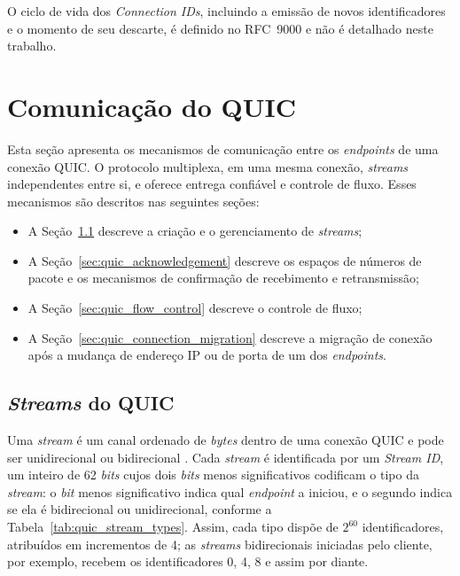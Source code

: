 O ciclo de vida dos \textit{Connection IDs}, incluindo a emissão de novos identificadores e o momento de seu descarte, é definido no RFC~9000 \citep{rfc9000} e não é detalhado neste trabalho.

\section{Comunicação do QUIC}

Esta seção apresenta os mecanismos de comunicação entre os \textit{endpoints} de uma conexão QUIC. O protocolo multiplexa, em uma mesma conexão, \textit{streams} independentes entre si, e oferece entrega confiável e controle de fluxo. Esses mecanismos são descritos nas seguintes seções:

\begin{itemize}
    \item A Seção~\ref{sec:quic_streams} descreve a criação e o gerenciamento de \textit{streams};
    \item A Seção~\ref{sec:quic_acknowledgement} descreve os espaços de números de pacote e os mecanismos de confirmação de recebimento e retransmissão;
    \item A Seção~\ref{sec:quic_flow_control} descreve o controle de fluxo;
    \item A Seção~\ref{sec:quic_connection_migration} descreve a migração de conexão após a mudança de endereço IP ou de porta de um dos \textit{endpoints}.
\end{itemize}

\subsection{\textit{Streams} do QUIC}
\label{sec:quic_streams}

Uma \textit{stream} é um canal ordenado de \textit{bytes} dentro de uma conexão QUIC e pode ser unidirecional ou bidirecional \citep{rfc9000}. Cada \textit{stream} é identificada por um \textit{Stream ID}, um inteiro de 62 \textit{bits} cujos dois \textit{bits} menos significativos codificam o tipo da \textit{stream}: o \textit{bit} menos significativo indica qual \textit{endpoint} a iniciou, e o segundo indica se ela é bidirecional ou unidirecional, conforme a Tabela~\ref{tab:quic_stream_types}. Assim, cada tipo dispõe de $2^{60}$ identificadores, atribuídos em incrementos de 4; as \textit{streams} bidirecionais iniciadas pelo cliente, por exemplo, recebem os identificadores 0, 4, 8 e assim por diante.

